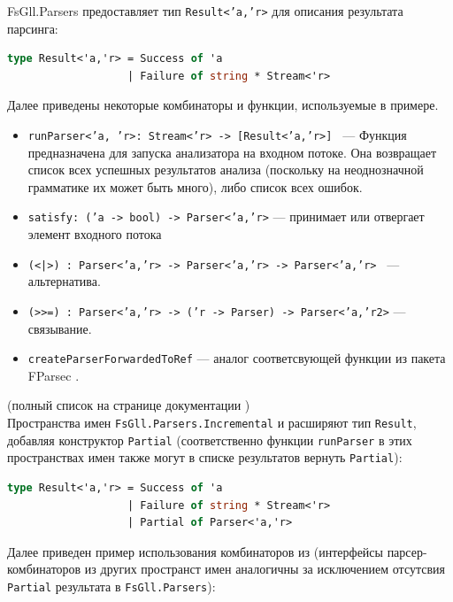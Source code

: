 \documentclass[14pt]{matmex-diploma}
\begin{document}
FsGll.Parsers предоставляет тип {\tt Result<'a,'r>} для описания результата парсинга:
\begin{lstlisting}[language=FSharp]
type Result<'a,'r> = Success of 'a
    	           | Failure of string * Stream<'r>
\end{lstlisting}

Далее приведены некоторые комбинаторы и функции, используемые в примере.
\begin{itemize}
    \item {\tt runParser<'a, 'r>: Stream<'r> -> [Result<'a,'r>] } --- Функция  предназначена для запуска анализатора на входном потоке. Она возвращает список всех успешных результатов анализа (поскольку на неоднозначной грамматике их может быть много), либо список всех ошибок.
    \item {\tt satisfy: ('a -> bool) -> Parser<'a,'r>} --- принимает или отвергает элемент входного потока 
    \item {\tt (<|>) : Parser<'a,'r> -> Parser<'a,'r> -> Parser<'a,'r> } --- альтернатива.
    \item {\tt (>}{\tt >=) : Parser<'a,'r> -> ('r -> Parser) -> Parser<'a,'r2>} --- связывание.
    \item {\tt createParserForwardedToRef} --- аналог соответсвующей функции из пакета FParsec
        \cite{fparsec:createpforwtoref}.
\end{itemize}
(полный список на странице документации \cite{fsglldoc})\\

Пространства имен {\tt FsGll.Parsers.Incremental} и  
расширяют тип {\tt Result}, добавляя конструктор {\tt Partial} 
(соответственно функции {\tt runParser} в этих пространствах имен также могут 
в списке результатов вернуть {\tt Partial}):

\begin{lstlisting}[language=FSharp]
type Result<'a,'r> = Success of 'a
    	           | Failure of string * Stream<'r>
                   | Partial of Parser<'a,'r>
\end{lstlisting}

Далее приведен пример использования комбинаторов из  
(интерфейсы парсер-комбинаторов из других пространст имен аналогичны за исключением
отсутсвия {\tt Partial} результата в {\tt FsGll.Parsers}):
\end{document}
